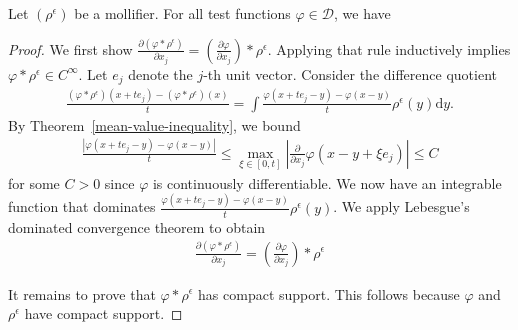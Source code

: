\begin{lemma}\label{mollifier-lemma}
    Let \((\rho^\epsilon)\) be a mollifier. For all test functions \(\varphi \in \mathcal{D}\), we have
\end{lemma}

\begin{proof}
    We first show \(\frac{\partial (\varphi * \rho^{\epsilon})}{\partial x_j} = \left(\frac{\partial \varphi}{\partial x_j}\right) * \rho^{\epsilon}\). Applying that rule inductively implies \(\varphi * \rho^{\epsilon} \in C^{\infty}\). Let \(e_j\) denote the \(j\)-th unit vector. Consider the difference quotient
    \begin{align*}
        \frac{(\varphi * \rho^\epsilon)(x + te_j) - (\varphi * \rho^\epsilon)(x)}{t} = \int \frac{\varphi(x+te_j - y) - \varphi(x-y)}{t}\rho^{\epsilon}(y) \mathrm{d}y.
    \end{align*}
    By Theorem~\ref{mean-value-inequality}, we bound
    \begin{align*}
        \frac{|\varphi (x + te_j - y) - \varphi (x-y)|}{t} \leq \max_{\xi \in [0,t]}\left |\frac{\partial}{\partial x_j}\varphi(x - y + \xi e_j) \right | \leq C
    \end{align*}
    for some \(C > 0\) since \({\varphi}\) is continuously differentiable. We now have an integrable function that dominates \(\frac{\varphi(x+te_j - y) - \varphi(x-y)}{t}\rho^{\epsilon}(y)\). We apply Lebesgue's dominated convergence theorem to obtain 
    \begin{align*}
        \frac{\partial (\varphi * \rho^{\epsilon})}{\partial x_j} = \left(\frac{\partial \varphi}{\partial x_j}\right) * \rho^{\epsilon}
    \end{align*}

    It remains to prove that \(\varphi * \rho^{\epsilon}\) has compact support. This follows because \({\varphi}\) and \(\rho^{\epsilon}\) have compact support.


\end{proof}

